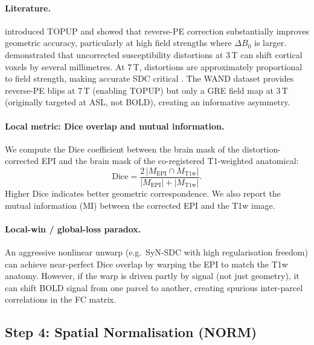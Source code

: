 \documentclass[11pt,a4paper]{article}
\begin{document}
\paragraph{Literature.}
\citet{andersson2003} introduced TOPUP and showed that reverse-PE correction substantially improves geometric accuracy, particularly at high field strengths where $\Delta B_0$ is larger.  \citet{jezzard1995} demonstrated that uncorrected susceptibility distortions at 3\,T can shift cortical voxels by several millimetres.  At 7\,T, distortions are approximately proportional to field strength, making accurate SDC critical \citep{robinson2014}.  The WAND dataset provides reverse-PE blips at 7\,T (enabling TOPUP) but only a GRE field map at 3\,T (originally targeted at ASL, not BOLD), creating an informative asymmetry.

\paragraph{Local metric: Dice overlap and mutual information.}
We compute the Dice coefficient between the brain mask of the distortion-corrected EPI and the brain mask of the co-registered T1-weighted anatomical:
\begin{equation}
    \mathrm{Dice} = \frac{2\,|M_{\mathrm{EPI}} \cap M_{\mathrm{T1w}}|}{|M_{\mathrm{EPI}}| + |M_{\mathrm{T1w}}|}.
\end{equation}
Higher Dice indicates better geometric correspondence.  We also report the mutual information (MI) between the corrected EPI and the T1w image.

\paragraph{Local-win / global-loss paradox.}
An aggressive nonlinear unwarp (e.g.\ SyN-SDC with high regularisation freedom) can achieve near-perfect Dice overlap by warping the EPI to match the T1w anatomy.  However, if the warp is driven partly by signal (not just geometry), it can shift BOLD signal from one parcel to another, creating spurious inter-parcel correlations in the FC matrix.


\subsection{Step 4: Spatial Normalisation (NORM)}
\label{app:norm}
\end{document}
